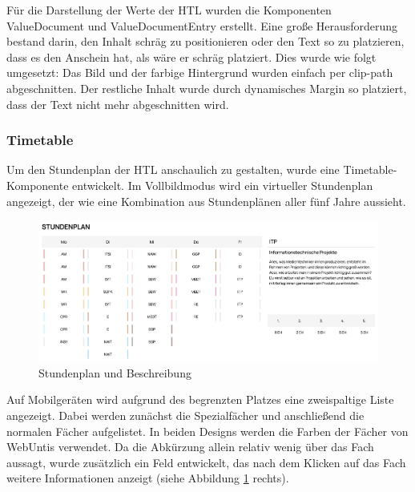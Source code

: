 Für die Darstellung der Werte der HTL wurden die Komponenten ValueDocument und ValueDocumentEntry erstellt. 
Eine große Herausforderung bestand darin, den Inhalt schräg zu positionieren oder den Text so zu platzieren, dass es den Anschein hat, als wäre er schräg platziert. 
Dies wurde wie folgt umgesetzt: Das Bild und der farbige Hintergrund wurden einfach per clip-path abgeschnitten. 
Der restliche Inhalt wurde durch dynamisches Margin so platziert, dass der Text nicht mehr abgeschnitten wird.

\subsubsection*{Timetable}

Um den Stundenplan der HTL anschaulich zu gestalten, wurde eine Timetable-Komponente entwickelt. 
Im Vollbildmodus wird ein virtueller Stundenplan angezeigt, der wie eine Kombination aus Stundenplänen aller fünf Jahre aussieht. 

\begin{figure}[H]
    \centering
    \includegraphics[width=\linewidth]{pics/timetable-big.png}
    \caption{Stundenplan und Beschreibung}
    \label{fig:impl:timetable}
\end{figure} 

Auf Mobilgeräten wird aufgrund des begrenzten Platzes eine zweispaltige Liste angezeigt. 
Dabei werden zunächst die Spezialfächer und anschließend die normalen Fächer aufgelistet. 
In beiden Designs werden die Farben der Fächer von WebUntis verwendet. 
Da die Abkürzung allein relativ wenig über das Fach aussagt, wurde zusätzlich ein Feld entwickelt, das nach dem Klicken auf das Fach weitere Informationen anzeigt (siehe Abbildung \ref{fig:impl:timetable} rechts).

